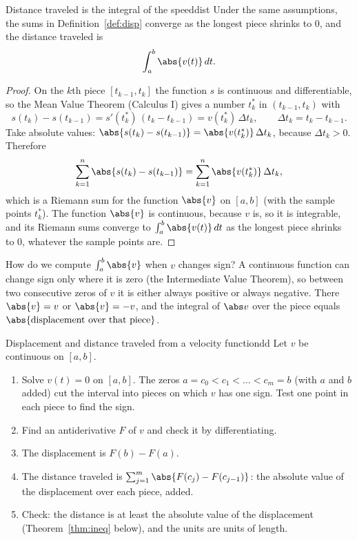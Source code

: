 \documentclass[11pt]{article}
\begin{document}
\begin{thm}{Distance traveled is the integral of the speed}{dist}
Under the same assumptions, the sums in Definition~\ref{def:disp} converge as the longest piece shrinks to $0$, and the distance traveled is
\[
\int_a^b\abs{v(t)}\,dt .
\]
\end{thm}
\begin{proof}
On the $k$th piece $[t_{k-1},t_k]$ the function $s$ is continuous and differentiable, so the Mean Value Theorem (Calculus I) gives a number $t_k^*$ in $(t_{k-1},t_k)$ with
\[
s(t_k)-s(t_{k-1})=s'(t_k^*)\,(t_k-t_{k-1})=v(t_k^*)\,\Delta t_k,\qquad \Delta t_k=t_k-t_{k-1}.
\]
Take absolute values: $\abs{s(t_k)-s(t_{k-1})}=\abs{v(t_k^*)}\,\Delta t_k$, because $\Delta t_k>0$. Therefore
\[
\sum_{k=1}^n\abs{s(t_k)-s(t_{k-1})}=\sum_{k=1}^n\abs{v(t_k^*)}\,\Delta t_k ,
\]
which is a Riemann sum for the function $\abs{v}$ on $[a,b]$ (with the sample points $t_k^*$). The function $\abs{v}$ is continuous, because $v$ is, so it is integrable, and its Riemann sums converge to $\int_a^b\abs{v(t)}\,dt$ as the longest piece shrinks to $0$, whatever the sample points are.
\end{proof}

How do we compute $\int_a^b\abs{v}$ when $v$ changes sign? A continuous function can change sign only where it is zero (the Intermediate Value Theorem), so between two consecutive zeros of $v$ it is either always positive or always negative. There $\abs{v}=v$ or $\abs{v}=-v$, and the integral of $\abs v$ over the piece equals $\abs{\text{displacement over that piece}}$.

\begin{proc}{Displacement and distance traveled from a velocity function}{dd}
Let $v$ be continuous on $[a,b]$.
\begin{enumerate}[nosep]
  \item Solve $v(t)=0$ on $[a,b]$. The zeros $a=c_0<c_1<\dots<c_m=b$ (with $a$ and $b$ added) cut the interval into pieces on which $v$ has one sign. Test one point in each piece to find the sign.
  \item Find an antiderivative $F$ of $v$ and check it by differentiating.
  \item The displacement is $F(b)-F(a)$.
  \item The distance traveled is $\sum_{j=1}^m\abs{F(c_j)-F(c_{j-1})}$: the absolute value of the displacement over each piece, added.
  \item Check: the distance is at least the absolute value of the displacement (Theorem~\ref{thm:ineq} below), and the units are units of length.
\end{enumerate}
\end{proc}
\end{document}
